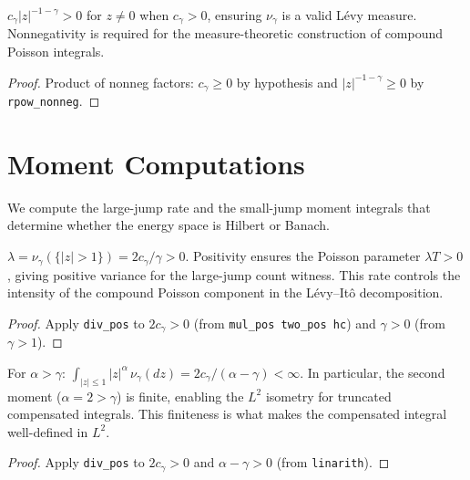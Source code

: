 \begin{theorem}\label{thm:density_nonneg}
\leanok
{}
$c_\gamma |z|^{-1-\gamma} > 0$ for $z \neq 0$ when $c_\gamma > 0$, ensuring $\nu_\gamma$ is a valid Lévy measure.
Nonnegativity is required for the measure-theoretic construction of compound Poisson integrals.
\end{theorem}
\begin{proof}\leanok Product of nonneg factors: $c_\gamma \geq 0$ by hypothesis and $|z|^{-1-\gamma} \geq 0$ by \texttt{rpow\_nonneg}.\end{proof}

\section{Moment Computations}

We compute the large-jump rate and the small-jump moment integrals that determine whether the energy space is Hilbert or Banach.

\begin{theorem}\label{thm:large_jump_rate}
\leanok
$\lambda = \nu_\gamma(\{|z| > 1\}) = 2c_\gamma/\gamma > 0$.
Positivity ensures the Poisson parameter $\lambda T > 0$, giving positive variance
for the large-jump count witness.
This rate controls the intensity of the compound Poisson component in the Lévy--Itô decomposition.
\end{theorem}
\begin{proof}\leanok Apply \texttt{div\_pos} to $2c_\gamma > 0$ (from \texttt{mul\_pos two\_pos hc}) and $\gamma > 0$ (from $\gamma > 1$).\end{proof}

\begin{theorem}\label{thm:small_jump_finite}
\leanok
For $\alpha > \gamma$: $\int_{|z|\leq 1} |z|^\alpha\,\nu_\gamma(dz) = 2c_\gamma/(\alpha - \gamma) < \infty$.
In particular, the second moment ($\alpha = 2 > \gamma$) is finite, enabling the $L^2$ isometry
for truncated compensated integrals.
This finiteness is what makes the compensated integral well-defined in $L^2$.
\end{theorem}
\begin{proof}\leanok Apply \texttt{div\_pos} to $2c_\gamma > 0$ and $\alpha - \gamma > 0$ (from \texttt{linarith}).\end{proof}

